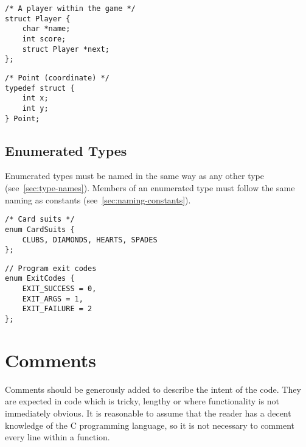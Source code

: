 \documentclass{article}
\begin{document}
\nolinenumbers
\begin{multicols}{2}
\begin{lstlisting}
/* A player within the game */
struct Player {
    char *name;
    int score;
    struct Player *next;
};
\end{lstlisting}
\vfill
\columnbreak

\begin{lstlisting}
/* Point (coordinate) */
typedef struct {
    int x;
    int y;
} Point;
\end{lstlisting}
\end{multicols}
\linenumbers

\subsection{Enumerated Types}
Enumerated types must be named in the same way as any other type (see~\ref{sec:type-names}).
Members of an enumerated type must follow the same naming as constants (see~\ref{sec:naming-constants}).

\nolinenumbers
\begin{multicols}{2}
\begin{lstlisting}
/* Card suits */
enum CardSuits {
    CLUBS, DIAMONDS, HEARTS, SPADES
};
\end{lstlisting}
\vfill
\columnbreak

\begin{lstlisting}
// Program exit codes
enum ExitCodes {
    EXIT_SUCCESS = 0,
    EXIT_ARGS = 1,
    EXIT_FAILURE = 2
};
\end{lstlisting}
\end{multicols}
\linenumbers

\section{Comments}
Comments should be generously added to describe the intent of the code.
They are expected in code which is tricky, lengthy or where functionality is not immediately obvious.
It is reasonable to assume that the reader has a decent knowledge of the C programming language, 
so it is not necessary to comment every line within a function.
\end{document}

